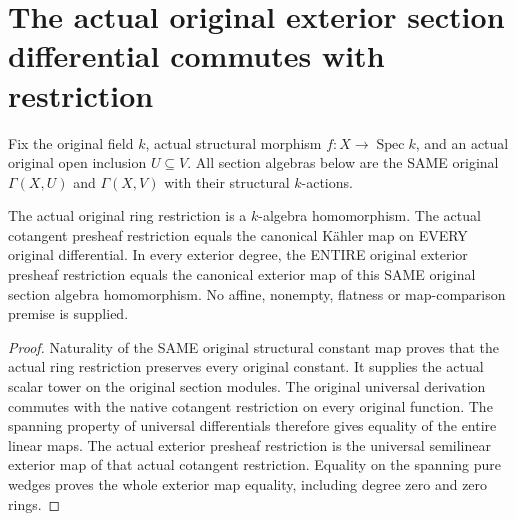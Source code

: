 \section{The actual original exterior section differential commutes with restriction}
\label{sec:etale-scheme-section-differential}

Fix the original field $k$, actual structural morphism
$f:X\to\operatorname{Spec}k$, and an actual original open inclusion
$U\subseteq V$. All section algebras below are the SAME original
$\Gamma(X,U)$ and $\Gamma(X,V)$ with their structural $k$-actions.

\begin{lemma}
\label{lem:cartier-original-raw-section-restriction}
\leanok
The actual original ring restriction is a $k$-algebra homomorphism.
The actual cotangent presheaf restriction equals the canonical
K\"ahler map on EVERY original differential. In every exterior
degree, the ENTIRE original exterior presheaf restriction equals
the canonical exterior map of this SAME original section algebra
homomorphism. No affine, nonempty, flatness or map-comparison
premise is supplied.
\end{lemma}
\begin{proof}
Naturality of the SAME original structural constant map proves
that the actual ring restriction preserves every original constant.
It supplies the actual scalar tower on the original section modules.
The original universal derivation commutes with the native
cotangent restriction on every original function. The spanning
property of universal differentials therefore gives equality of
the entire linear maps. The actual exterior presheaf restriction
is the universal semilinear exterior map of that actual cotangent
restriction. Equality on the spanning pure wedges proves the
whole exterior map equality, including degree zero and zero rings.
\end{proof}

